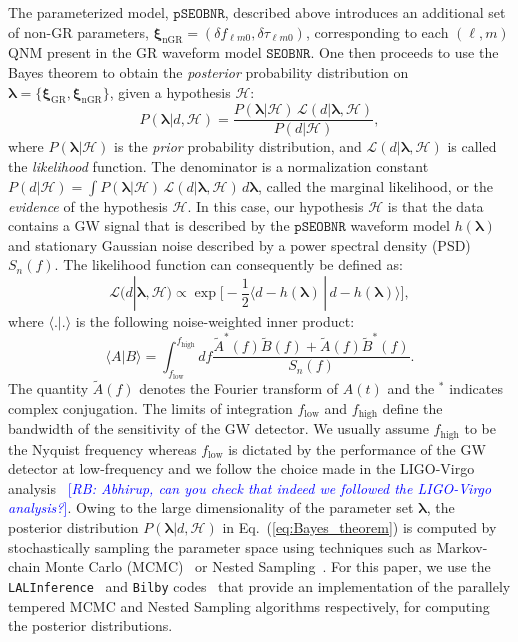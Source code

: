 \documentclass[twocolumn,prd,aps,superscriptaddress,preprintnumbers,tightenlines,showpacs,nofootinbib,eqsecnum,amsfonts,amsmath]{revtex4-1}
\newcommand{\rb}[1]{\textcolor{blue}{[\textit{RB: #1}]}}
\newcommand{\blambda}{\bm{\lambda}}
\newcommand{\bxigr}{\bm{\xi}_{\text{GR}}}
\newcommand{\bxingr}{\bm{\xi}_{\text{nGR}}}
\newcommand{\pSEOB}{\texttt{pSEOBNR}}
\newcommand{\SEOB}{\texttt{SEOBNR}}
\begin{document}
The parameterized model, $\pSEOB$, described above introduces an additional set of non-GR parameters, $\bxingr = (\delta f_{\ell m 0},\delta \tau_{\ell m 0})$, corresponding to each $(\ell,m)$ QNM present in the GR waveform model $\SEOB$. One then proceeds to use the Bayes theorem to obtain the \emph{posterior} probability distribution on $\blambda = \{\bxigr, \bxingr\}$, given a hypothesis $\mathcal{H}$:
%
\begin{equation}
P(\blambda | d, \mathcal{H}) = \frac{P(\blambda | \mathcal{H}) \, \mathcal{L}(d | \blambda, \mathcal{H})}{P(d|\mathcal{H})},
\label{eq:Bayes_theorem}
\end{equation}
%
where $P(\blambda | \mathcal{H})$ is the \emph{prior} probability distribution, and $\mathcal{L}(d | \blambda, \mathcal{H})$ is called the \emph{likelihood} function. The denominator is a normalization constant $P(d|\mathcal{H}) = \int P(\blambda | \mathcal{H}) \, \mathcal{L}(d | \blambda, \mathcal{H}) \, d\blambda$, called the marginal likelihood, or the \emph{evidence} of the hypothesis $\mathcal{H}$. In this case, our hypothesis $\mathcal{H}$ is that the data contains a GW signal that is described by the $\pSEOB$ waveform model $h(\blambda)$  and stationary Gaussian noise described by a power spectral density (PSD) $S_n(f)$. The likelihood function can consequently be defined as:
%
\begin{equation}
\mathcal{L}(d | \blambda, \mathcal{H}) \propto \exp\big[-\frac{1}{2} \langle d - h(\blambda) \, | \, d -h(\blambda) \rangle \big],
\label{eq:likelihood}
\end{equation}
%
where $\langle . | . \rangle$ is the following noise-weighted inner product:
%
\begin{equation}
\langle A | B \rangle = \int_{f_\mathrm{low}} ^{f_\mathrm{high}} df \frac{\tilde{A}^*(f)\tilde{B}(f) + \tilde{A}(f)\tilde{B}^*(f)}{S_n(f)}.
\label{eq:nwip}
\end{equation}
%
The quantity $\tilde{A}(f)$ denotes the Fourier transform of $A(t)$ and the $^*$ indicates complex conjugation. The limits of integration ${f_\mathrm{low}}$ and ${f_\mathrm{high}}$ define the bandwidth of the sensitivity of the GW detector. We usually assume ${f_\mathrm{high}}$ to be the Nyquist frequency whereas ${f_\mathrm{low}}$ is dictated by the performance of the 
GW detector at low-frequency and we follow the choice made in the LIGO-Virgo analysis~\cite{LIGOScientific:2018mvr,Abbott:2020niy} \rb{Abhirup, can you check that indeed we followed the LIGO-Virgo analysis?}. Owing to the large dimensionality of the parameter set $\blambda$, the posterior distribution $P(\blambda | d, \mathcal{H})$ in Eq.~(\ref{eq:Bayes_theorem}) is computed by stochastically sampling the parameter space using techniques such as Markov-chain Monte Carlo (MCMC)~\cite{Metropolis:1953am,Hastings:1970aa} or Nested Sampling~\cite{Skilling:2006gxv}. For this paper, we use the \verb+LALInference+~\cite{Veitch:2014wba} and \verb+Bilby+ codes~\cite{Ashton:2018jfp,Smith:2019ucc} that provide an implementation of the parallely tempered MCMC and Nested Sampling algorithms respectively, for computing the posterior distributions. 
\end{document}
